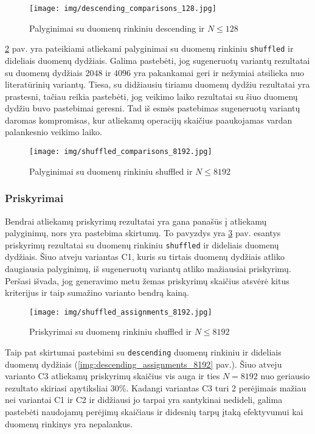 \documentclass{VUMIFInfBakalaurinis}
\begin{document}
\begin{figure}[H]
  \centering
  \texttt{[image: img/descending\_comparisons\_128.jpg]}
  \caption{Palyginimai su duomenų rinkiniu descending ir $N \leq 128$}
  \label{img:descending_comparisons_128}
\end{figure}

\ref{img:shuffled_comparisons_8192} pav. yra pateikiami atliekami palyginimai su duomenų rinkiniu \verb|shuffled| ir dideliais duomenų dydžiais.
Galima pastebėti, jog sugeneruotų variantų rezultatai su duomenų dydžiais $2048$ ir $4096$ yra pakankamai geri ir nežymiai atsilieka nuo literatūrinių variantų.
Tiesa, su didžiausiu tiriamu duomenų dydžiu rezultatai yra prastesni, tačiau reikia pastebėti, jog veikimo laiko rezultatai su šiuo duomenų dydžiu buvo pastebimai geresni.
Tad iš esmės pastebimas sugeneruotų variantų daromas kompromisas, kur atliekamų operacijų skaičius paaukojamas vardan palankesnio veikimo laiko.

\begin{figure}[H]
  \centering
  \texttt{[image: img/shuffled\_comparisons\_8192.jpg]}
  \caption{Palyginimai su duomenų rinkiniu shuffled ir $N \leq 8192$}
  \label{img:shuffled_comparisons_8192}
\end{figure}

\pagebreak

\subsubsection{Priskyrimai}

Bendrai atliekamų priskyrimų rezultatai yra gana panašūs į atliekamų palyginimų, nors yra pastebima skirtumų.
To pavyzdys yra \ref{img:shuffled_assignments_8192} pav. esantys priskyrimų rezultatai su duomenų rinkiniu \verb|shuffled| ir dideliais duomenų dydžiais.
Šiuo atveju variantas C1, kuris su tirtais duomenų dydžiais atliko daugiausia palyginimų, iš sugeneruotų variantų atliko mažiausiai priskyrimų.
Peršasi išvada, jog generavimo metu žemas priskyrimų skaičius atsvėrė kitus kriterijus ir taip sumažino varianto bendrą kainą.    

\begin{figure}[H]
  \centering
  \texttt{[image: img/shuffled\_assignments\_8192.jpg]}
  \caption{Priskyrimai su duomenų rinkiniu shuffled ir $N \leq 8192$}
  \label{img:shuffled_assignments_8192}
\end{figure}

Taip pat skirtumai pastebimi su \verb|descending| duomenų rinkiniu ir dideliais duomenų dydžiais (\ref{img:descending_assignments_8192} pav.).
Šiuo atveju varianto C3 atliekamų priskyrimų skaičius vis auga ir ties $N = 8192$ nuo geriausio rezultato skiriasi apytiksliai 30\%.
Kadangi variantas C3 turi 2 perėjimais mažiau nei variantai C1 ir C2 ir didžiausi jo tarpai yra santykinai nedideli,
galima pastebėti naudojamų perėjimų skaičiaus ir didesnių tarpų įtaką efektyvumui kai duomenų rinkinys yra nepalankus.
\end{document}
